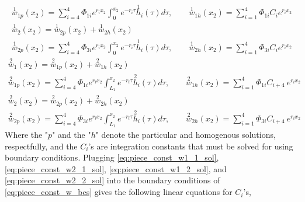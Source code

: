 \documentclass[11pt]{report}
\begin{document}
\begin{appendices}
\begin{equation}
\begin{gathered}
\overset{1}{w}_{1p}(x_2) = \sum_{i = 4}^{4} \Phi_{1i} e^{r_i x_2} \int_{0}^{x_2} e^{-r_i \tau} \overset{1}{h}_i(\tau) d\tau , \qquad \overset{1}{w}_{1h}(x_2) = \sum_{i = 1}^{4} \Phi_{1i} C_{i} e^{r_i x_2}
\end{gathered}
\end{equation}
\begin{equation} \label{eq:piece_const_w2_1_sol}
\begin{gathered}
\overset{1}{w}_2(x_2) = \overset{1}{w}_{2p}(x_2) + \overset{1}{w}_{2h}(x_2)  \\
\overset{1}{w}_{2p}(x_2) = \sum_{i = 4}^{4} \Phi_{3i} e^{r_i x_2} \int_{0}^{x_2} e^{-r_i \tau} \overset{1}{h}_i(\tau) d\tau , \qquad \overset{1}{w}_{2h}(x_2) = \sum_{i = 1}^{4} \Phi_{3i} C_{i} e^{r_i x_2}
\end{gathered}
\end{equation}
\begin{equation} \label{eq:piece_const_w1_2_sol}
\begin{gathered}
\overset{2}{w}_1(x_2) = \overset{2}{w}_{1p}(x_2) + \overset{2}{w}_{1h}(x_2)  \\
\overset{2}{w}_{1p}(x_2) = \sum_{i = 4}^{4} \Phi_{1i} e^{r_i x_2} \int_{L_1}^{x_2} e^{-r_i \tau} \overset{2}{h}_i(\tau) d\tau , \qquad \overset{2}{w}_{1h}(x_2) = \sum_{i = 1}^{4} \Phi_{1i} C_{i+4} \: e^{r_i x_2}
\end{gathered}
\end{equation}
\begin{equation} \label{eq:piece_const_w2_2_sol}
\begin{gathered}
\overset{2}{w}_2(x_2) = \overset{2}{w}_{2p}(x_2) + \overset{2}{w}_{2h}(x_2)  \\
\overset{2}{w}_{2p}(x_2) = \sum_{i = 4}^{4} \Phi_{3i} e^{r_i x_2} \int_{L_1}^{x_2} e^{-r_i \tau} \overset{2}{h}_i(\tau) d\tau , \qquad \overset{2}{w}_{2h}(x_2) = \sum_{i = 1}^{4} \Phi_{3i} C_{i+4} \: e^{r_i x_2}
\end{gathered}
\end{equation}
Where the "$p$" and the "$h$" denote the particular and homogenous solutions, respectfully, and the $C_i$'s are integration constants that must be solved for using boundary conditions. Plugging \eqref{eq:piece_const_w1_1_sol}, \eqref{eq:piece_const_w2_1_sol}, \eqref{eq:piece_const_w1_2_sol}, and \eqref{eq:piece_const_w2_2_sol} into the boundary conditions of \eqref{eq:piece_const_w_bcs} gives the following linear equations for $C_i$'s,
\begin{small}
\begin{equation}

\end{equation}
\end{small}
\end{appendices}
\end{document}
